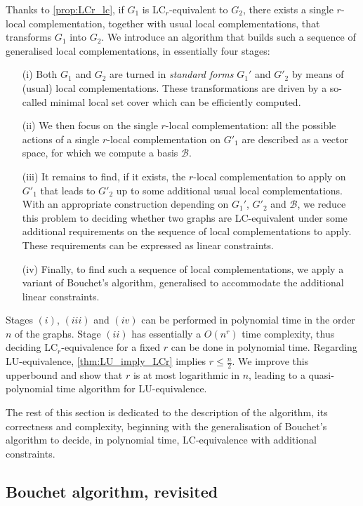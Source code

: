 \documentclass[a4paper,UKenglish,cleveref,autoref,thm-restate]{arxiv}
\begin{document}
Thanks to \cref{prop:LCr_lc}, if $G_1$ is  LC$_r$-equivalent to $G_2$, there exists a single $r$-local complementation, together with usual local complementations, that transforms $G_1$ into $G_2$. We introduce an algorithm that builds such a sequence of generalised local complementations, in essentially four stages: 
\begin{itemize}
\item[(i)] Both $G_1$ and $G_2$ are turned in \emph{standard forms} $G_1'$ and $G'_2$ by means of (usual) local complementations. These transformations are driven by a so-called  minimal local set cover which can be efficiently computed.  
\item[(ii)] We then focus on the single $r$-local complementation: all the possible actions of a single $r$-local complementation on $G'_1$ are described as a vector space, for which we compute a basis $\mathcal B$.  
\item[(iii)] It remains to find, if it exists, the $r$-local complementation to apply on $G'_1$ that leads to $G'_2$ up to some additional usual local complementations. With an appropriate construction depending on $G_1'$, $G'_2$ and $\mathcal B$, we reduce this problem to deciding whether two graphs are LC-equivalent under some additional requirements  on the sequence of local complementations to apply. These requirements can be expressed as linear constraints.
\item [(iv)] Finally, to find such a sequence of local complementations, we apply a variant of Bouchet's algorithm, generalised to accommodate the additional linear constraints. 
\end{itemize}

Stages $(i)$, $(iii)$ and $(iv)$ can be performed in polynomial time in the order $n$ of the graphs. Stage $(ii)$ has essentially a $O(n^r)$ time complexity, thus deciding LC$_r$-equivalence for a fixed $r$ can be done in polynomial time. Regarding LU-equivalence, \cref{thm:LU_imply_LCr} implies $r\le \frac n2$. We improve this upperbound and show that $r$ is at most logarithmic in $n$, leading to a quasi-polynomial time algorithm for LU-equivalence. 


The rest of this section is dedicated to the description of the algorithm, its correctness and complexity, beginning with the generalisation of Bouchet's algorithm to decide, in polynomial time, LC-equivalence with additional constraints.

\subsection{Bouchet algorithm, revisited} \label{subsec:bouchet}
\end{document}

